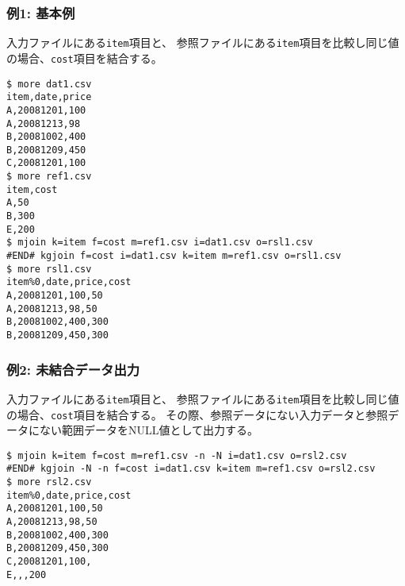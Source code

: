 \subsubsection*{例1: 基本例}

入力ファイルにある\verb|item|項目と、
参照ファイルにある\verb|item|項目を比較し同じ値の場合、\verb|cost|項目を結合する。


\begin{Verbatim}[baselinestretch=0.7,frame=single]
$ more dat1.csv
item,date,price
A,20081201,100
A,20081213,98
B,20081002,400
B,20081209,450
C,20081201,100
$ more ref1.csv
item,cost
A,50
B,300
E,200
$ mjoin k=item f=cost m=ref1.csv i=dat1.csv o=rsl1.csv
#END# kgjoin f=cost i=dat1.csv k=item m=ref1.csv o=rsl1.csv
$ more rsl1.csv
item%0,date,price,cost
A,20081201,100,50
A,20081213,98,50
B,20081002,400,300
B,20081209,450,300
\end{Verbatim}
\subsubsection*{例2: 未結合データ出力}

入力ファイルにある\verb|item|項目と、
参照ファイルにある\verb|item|項目を比較し同じ値の場合、\verb|cost|項目を結合する。
その際、参照データにない入力データと参照データにない範囲データをNULL値として出力する。


\begin{Verbatim}[baselinestretch=0.7,frame=single]
$ mjoin k=item f=cost m=ref1.csv -n -N i=dat1.csv o=rsl2.csv
#END# kgjoin -N -n f=cost i=dat1.csv k=item m=ref1.csv o=rsl2.csv
$ more rsl2.csv
item%0,date,price,cost
A,20081201,100,50
A,20081213,98,50
B,20081002,400,300
B,20081209,450,300
C,20081201,100,
E,,,200
\end{Verbatim}
